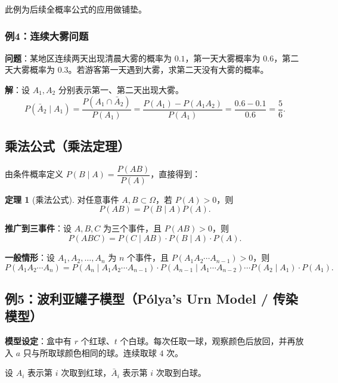 \documentclass[11pt,a4paper]{report}
\theoremstyle{definition}
\newtheorem{theorem}{定理}[chapter]
\begin{document}
此例为后续全概率公式的应用做铺垫。

\subsubsection{例4：连续大雾问题}

\textbf{问题}：某地区连续两天出现清晨大雾的概率为 $0.1$，第一天大雾概率为 $0.6$，第二天大雾概率为 $0.3$。若游客第一天遇到大雾，求第二天没有大雾的概率。

\textbf{解}：设 $A_1, A_2$ 分别表示第一、第二天出现大雾。
\[
P(\bar{A}_2 \mid A_1) = \frac{P(A_1 \cap \bar{A}_2)}{P(A_1)} = \frac{P(A_1) - P(A_1 A_2)}{P(A_1)} = \frac{0.6 - 0.1}{0.6} = \boxed{\frac{5}{6}}.
\]

\subsection{乘法公式（乘法定理）}

由条件概率定义 $P(B \mid A) = \dfrac{P(AB)}{P(A)}$，直接得到：

\begin{theorem}[乘法公式]
对任意事件 $A, B \subset \Omega$，若 $P(A) > 0$，则
\[
\boxed{P(AB) = P(B \mid A) P(A)}.
\]
\end{theorem}

\textbf{推广到三事件}：设 $A,B,C$ 为三个事件，且 $P(AB) > 0$，则
\[
P(ABC) = P(C \mid AB) \cdot P(B \mid A) \cdot P(A).
\]

\textbf{一般情形}：设 $A_1, A_2, \dots, A_n$ 为 $n$ 个事件，且 $P(A_1 A_2 \cdots A_{n-1}) > 0$，则
\[
\boxed{P(A_1 A_2 \cdots A_n) = P(A_n \mid A_1 A_2 \cdots A_{n-1}) \cdot P(A_{n-1} \mid A_1 \cdots A_{n-2}) \cdots P(A_2 \mid A_1) \cdot P(A_1)}.
\]

\subsection{例5：波利亚罐子模型（P\'{o}lya's Urn Model / 传染模型）}

\textbf{模型设定}：盒中有 $r$ 个红球、$t$ 个白球。每次任取一球，观察颜色后放回，并再放入 $a$ 只与所取球颜色相同的球。连续取球 $4$ 次。

设 $A_i$ 表示第 $i$ 次取到红球，$\bar{A}_i$ 表示第 $i$ 次取到白球。
\end{document}
